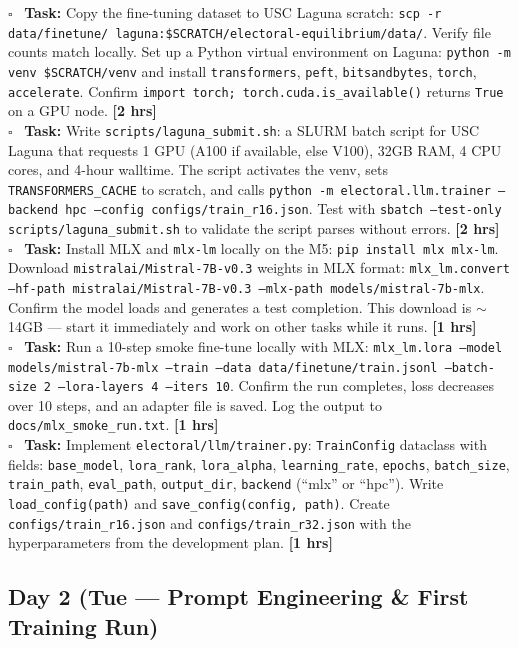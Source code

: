 \documentclass[11pt]{article}
\newcommand{\hrs}[1]{\textbf{[#1 hrs]}}
\newcommand{\dayhead}[2]{%
  \subsection*{Day #1 \normalfont\small\color{codegray}(#2)}}
\newcommand{\task}[2]{%
  \noindent\textbf{Task:} #1 \hfill \hrs{#2}\\}
\newcommand{\done}{\textcolor{sectionblue}{$\square$}\ }
\begin{document}
\begin{taskbox}
\done \task{Copy the fine-tuning dataset to USC Laguna scratch: \texttt{scp -r
  data/finetune/ laguna:\$SCRATCH/electoral-equilibrium/data/}. Verify file
  counts match locally. Set up a Python virtual environment on Laguna:
  \texttt{python -m venv \$SCRATCH/venv} and install
  \texttt{transformers}, \texttt{peft}, \texttt{bitsandbytes}, \texttt{torch},
  \texttt{accelerate}. Confirm \texttt{import torch; torch.cuda.is\_available()}
  returns \texttt{True} on a GPU node.}{2}

\done \task{Write \texttt{scripts/laguna\_submit.sh}: a SLURM batch script for
  USC Laguna that requests 1 GPU (A100 if available, else V100), 32GB RAM,
  4 CPU cores, and 4-hour walltime. The script activates the venv, sets
  \texttt{TRANSFORMERS\_CACHE} to scratch, and calls \texttt{python -m
  electoral.llm.trainer --backend hpc --config configs/train\_r16.json}.
  Test with \texttt{sbatch --test-only scripts/laguna\_submit.sh} to validate
  the script parses without errors.}{2}

\done \task{Install MLX and \texttt{mlx-lm} locally on the M5:
  \texttt{pip install mlx mlx-lm}. Download \texttt{mistralai/Mistral-7B-v0.3}
  weights in MLX format: \texttt{mlx\_lm.convert --hf-path
  mistralai/Mistral-7B-v0.3 --mlx-path models/mistral-7b-mlx}.
  Confirm the model loads and generates a test completion. This download
  is $\sim$14GB --- start it immediately and work on other tasks while
  it runs.}{1}

\done \task{Run a 10-step smoke fine-tune locally with MLX: \texttt{mlx\_lm.lora
  --model models/mistral-7b-mlx --train --data data/finetune/train.jsonl
  --batch-size 2 --lora-layers 4 --iters 10}. Confirm the run completes,
  loss decreases over 10 steps, and an adapter file is saved. Log the
  output to \texttt{docs/mlx\_smoke\_run.txt}.}{1}

\done \task{Implement \texttt{electoral/llm/trainer.py}: \texttt{TrainConfig}
  dataclass with fields: \texttt{base\_model}, \texttt{lora\_rank},
  \texttt{lora\_alpha}, \texttt{learning\_rate}, \texttt{epochs},
  \texttt{batch\_size}, \texttt{train\_path}, \texttt{eval\_path},
  \texttt{output\_dir}, \texttt{backend} (``mlx'' or ``hpc''). Write
  \texttt{load\_config(path)} and \texttt{save\_config(config, path)}.
  Create \texttt{configs/train\_r16.json} and \texttt{configs/train\_r32.json}
  with the hyperparameters from the development plan.}{1}
\end{taskbox}

\dayhead{2}{Tue --- Prompt Engineering \& First Training Run}
\end{document}
